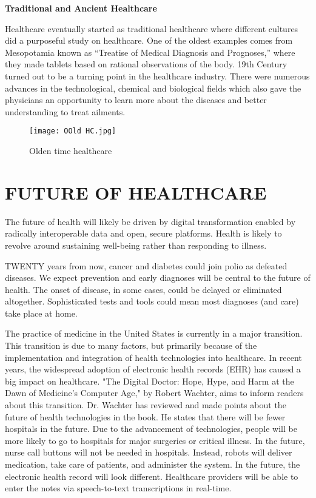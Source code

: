\documentclass[12pt,a4paper]{article}
\begin{document}
\hspace{2cm}

\textbf {Traditional and Ancient Healthcare}

\hspace{1cm}

Healthcare eventually started as traditional healthcare where different cultures did a purposeful study on healthcare. One of the oldest examples comes from Mesopotamia known as “Treatise of Medical Diagnosis and Prognoses,” where they made tablets based on rational observations of the body. 19th Century turned out to be a turning point in the healthcare industry. There were numerous advances in the technological, chemical and biological fields which also gave the physicians an opportunity to learn more about the diseases and better understanding to treat ailments.

\hspace{2cm}


\begin{figure}[h]
\centering
\texttt{[image: OOld HC.jpg]}
\caption{Olden time healthcare}
\end{figure}

\clearpage

\section{FUTURE OF HEALTHCARE}



The future of health will likely be driven by digital transformation enabled by radically interoperable data and open, secure platforms. Health is likely to revolve around sustaining well-being rather than responding to illness.


TWENTY years from now, cancer and diabetes could join polio as defeated diseases. We expect prevention and early diagnoses will be central to the future of health. The onset of disease, in some cases, could be delayed or eliminated altogether. Sophisticated tests and tools could mean most diagnoses (and care) take place at home.

The practice of medicine in the United States is currently in a major transition. This transition is due to many factors, but primarily because of the implementation and integration of health technologies into healthcare. In recent years, the widespread adoption of electronic health records (EHR) has caused a big impact on healthcare. "The Digital Doctor: Hope, Hype, and Harm at the Dawn of Medicine's Computer Age," by Robert Wachter, aims to inform readers about this transition. Dr. Wachter has reviewed and made points about the future of health technologies in the book. He states that there will be fewer hospitals in the future. Due to the advancement of technologies, people will be more likely to go to hospitals for major surgeries or critical illness. In the future, nurse call buttons will not be needed in hospitals. Instead, robots will deliver medication, take care of patients, and administer the system. In the future, the electronic health record will look different. Healthcare providers will be able to enter the notes via speech-to-text transcriptions in real-time.
\end{document}
